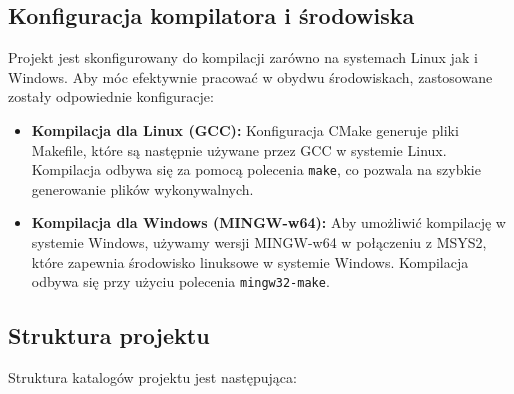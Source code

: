 \subsection{Konfiguracja kompilatora i środowiska}

Projekt jest skonfigurowany do kompilacji zarówno na systemach Linux jak i Windows. Aby móc efektywnie pracować w obydwu środowiskach, zastosowane zostały odpowiednie konfiguracje:

\begin{itemize}
	\item \textbf{Kompilacja dla Linux (GCC):} Konfiguracja CMake generuje pliki Makefile, które są następnie używane przez GCC w systemie Linux. Kompilacja odbywa się za pomocą polecenia \texttt{make}, co pozwala na szybkie generowanie plików wykonywalnych.
	\item \textbf{Kompilacja dla Windows (MINGW-w64):} Aby umożliwić kompilację w systemie Windows, używamy wersji MINGW-w64 w połączeniu z MSYS2, które zapewnia środowisko linuksowe w systemie Windows. Kompilacja odbywa się przy użyciu polecenia \texttt{mingw32-make}.
\end{itemize}

\subsection{Struktura projektu}

Struktura katalogów projektu jest następująca:

